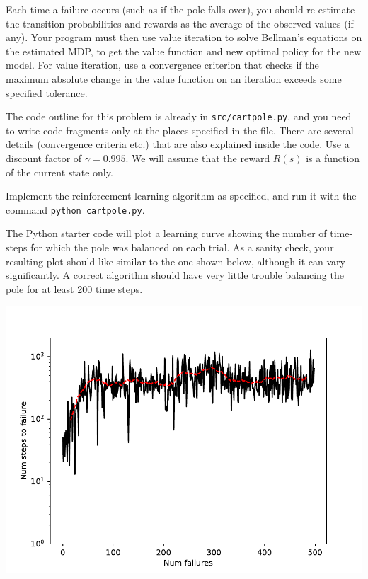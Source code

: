 Each time a failure occurs (such as if the pole falls over), you should 
re-estimate the transition probabilities and rewards as the average of 
the observed values (if any).  Your program must then use value iteration 
to solve Bellman's equations on the estimated MDP, to get the value function 
and new optimal policy for the new model.  For value iteration, use a 
convergence criterion that checks if the maximum absolute change in the 
value function on an iteration exceeds some specified tolerance. 

The code outline for this problem is already in 
{\tt src/cartpole.py}, and you need to write code fragments only at the
places specified in the file. There are several details (convergence criteria
etc.) that are also explained inside the code. Use a discount factor
of $\gamma = 0.995$.  We will assume that the reward $R(s)$ is a function of
the current state only.

Implement the reinforcement learning algorithm as specified, and run it with the command {\tt python cartpole.py}.

The Python starter code will plot a learning curve showing the number of time-steps for which the pole was balanced on each trial. As a sanity check, your resulting plot should like similar to the one shown below, although it can vary significantly.  A correct algorithm should have very little trouble balancing the pole for at least 200 time steps.

\begin{center}
  \includegraphics[scale=0.75]{cartpole/control}
\end{center}
